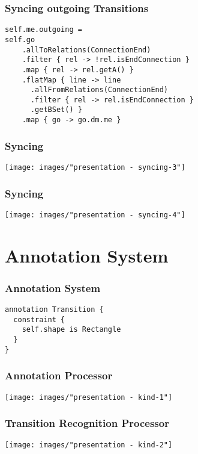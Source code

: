 \begin{frame}[fragile]
  \frametitle{Syncing outgoing Transitions}
  \vspace*{-1cm}
  \begin{lstlisting}
self.me.outgoing = 
self.go
    .allToRelations(ConnectionEnd)
    .filter { rel -> !rel.isEndConnection }
    .map { rel -> rel.getA() }
    .flatMap { line -> line
      .allFromRelations(ConnectionEnd)
      .filter { rel -> rel.isEndConnection }
      .getBSet() }
    .map { go -> go.dm.me }
  \end{lstlisting}
\end{frame}

\begin{frame}
  \frametitle{Syncing}
  \hspace{-1cm}
  \texttt{[image: images/"presentation - syncing-3"]}
\end{frame}

\begin{frame}
  \frametitle{Syncing}
  \hspace{-1cm}
  \texttt{[image: images/"presentation - syncing-4"]}
\end{frame}


\section*{Annotation System}
\begin{frame}
  \centering
  \hspace{-1cm}
  \huge
\end{frame}

\begin{frame}[fragile]
  \frametitle{Annotation System}
  \vspace*{-1cm}
  \begin{lstlisting}
annotation Transition {
  constraint {
    self.shape is Rectangle
  }
}
  \end{lstlisting}
\end{frame}


\begin{frame}
  \frametitle{Annotation Processor}
  \hspace{-1cm}
  \texttt{[image: images/"presentation - kind-1"]}
\end{frame}

\begin{frame}
  \frametitle{Transition Recognition Processor}
  \hspace{-1cm}
  \texttt{[image: images/"presentation - kind-2"]}
\end{frame}


